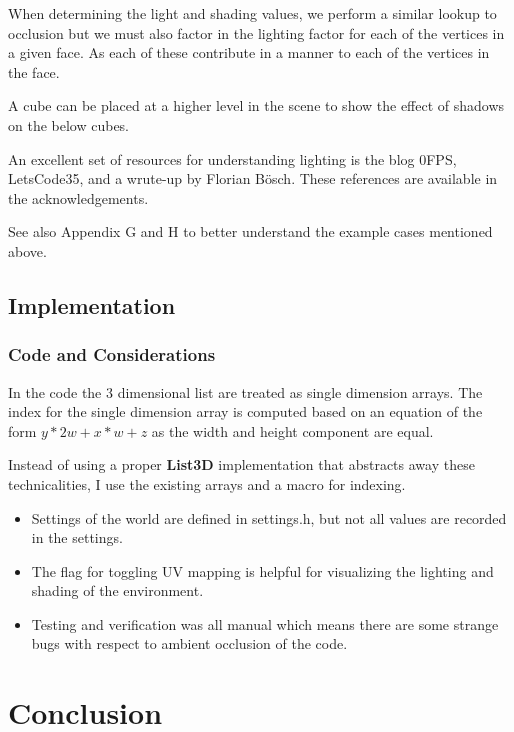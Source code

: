 \documentclass{book}
\begin{document}
When determining the light and shading values, we perform a similar lookup to occlusion but we must also factor in the lighting factor for each of the vertices in a given face.  As each of these contribute in a manner to each of the vertices in the face.
    
A cube can be placed at a higher level in the scene to show the effect of shadows on the below cubes.
    
An excellent set of resources for understanding lighting is the blog 0FPS, LetsCode35, and a wrute-up by Florian Bösch.  These references are available in the acknowledgements.
    
See also Appendix G and H to better understand the example cases mentioned above.
    
\section{Implementation}
\subsection{Code and Considerations}
In the code the 3 dimensional list are treated as single dimension arrays.  The index for the single dimension array is computed based on an equation of the form $y * 2w + x*w + z$ as the width and height component are equal.
    
Instead of using a proper \textbf{List3D} implementation that abstracts away these technicalities, I use the existing arrays and a macro for indexing.  
    
\begin{itemize}
	\item Settings of the world are defined in settings.h, but not all values are recorded in the settings.
	      
	\item The flag for toggling UV mapping is helpful for visualizing the lighting and shading of the environment.
	      
	\item Testing and verification was all manual which means there are some strange bugs with respect to ambient occlusion of the code.
\end{itemize}


\chapter{Conclusion}
\end{document}
